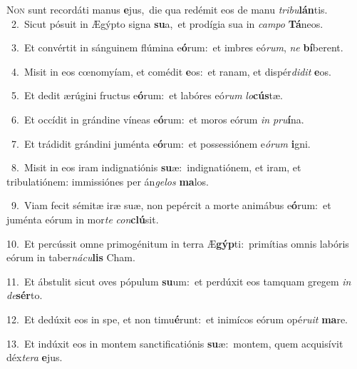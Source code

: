 \lettrine{\initial\textcolor{\initialcolor}{N}}{on} sunt recordáti manus \textbf{e}\-jus,~\star die qua redémit eos de manu \textit{tri}\-\textit{bu}\textbf{lán}tis.\\
{\numbfont\textcolor{\numbcolor}{~2.}}~Sicut pósuit in Ægýpto signa \textbf{su}\-a,~\star et prodígia sua in \textit{cam}\-\textit{po} \textbf{Tá}\-neos.\par
{\numbfont\textcolor{\numbcolor}{~3.}}~Et convértit in sánguinem flúmina e\-\textbf{ó}\-rum:~\star et imbres eó\-\textit{rum}\-, \textit{ne} \textbf{bí}\-berent.\par
{\numbfont\textcolor{\numbcolor}{~4.}}~Misit in eos cœnomyíam, et comédit \textbf{e}\-os:~\star et ranam, et dispér\-\textit{di}\-\textit{dit} \textbf{e}\-os.\par
{\numbfont\textcolor{\numbcolor}{~5.}}~Et dedit ærúgini fructus e\-\textbf{ó}\-rum:~\star et labóres eó\textit{rum} \textit{lo}\-\textbf{cús}tæ.\par
{\numbfont\textcolor{\numbcolor}{~6.}}~Et occídit in grándine víneas e\-\textbf{ó}\-rum:~\star et moros eórum \textit{in} \textit{pru}\-\textbf{í}na.\par
{\numbfont\textcolor{\numbcolor}{~7.}}~Et trádidit grándini juménta e\-\textbf{ó}\-rum:~\star et possessiónem e\-\textit{ó}\-\textit{rum} \textbf{i}\-gni.\par
{\numbfont\textcolor{\numbcolor}{~8.}}~Misit in eos iram indignatiónis \textbf{su}\-æ:~\star indignatiónem, et iram, et tribulatiónem: immissiónes per án\-\textit{ge}\-\textit{los} \textbf{ma}\-los.\par
{\numbfont\textcolor{\numbcolor}{~9.}}~Viam fecit sémitæ iræ suæ, non pepércit a morte animábus e\-\textbf{ó}\-rum:~\star et juménta eórum in mor\textit{te} \textit{con}\-\textbf{clú}sit.\par
{\numbfont\textcolor{\numbcolor}{10.}}~Et percússit omne primogénitum in terra Æ\-\textbf{gýp}\-ti:~\star primítias omnis labóris eórum in taber\-\textit{ná}\-\textit{cu}\textbf{lis} Cham.\par
{\numbfont\textcolor{\numbcolor}{11.}}~Et ábstulit sicut oves pópulum \textbf{su}\-um:~\star et perdúxit eos tamquam gregem \textit{in} \textit{de}\-\textbf{sér}to.\par
{\numbfont\textcolor{\numbcolor}{12.}}~Et dedúxit eos in spe, et non timu\-\textbf{é}\-runt:~\star et inimícos eórum opé\-\textit{ru}\-\textit{it} \textbf{ma}\-re.\par
{\numbfont\textcolor{\numbcolor}{13.}}~Et indúxit eos in montem sanctificatiónis \textbf{su}\-æ:~\star montem, quem acquisívit déx\-\textit{te}\-\textit{ra} \textbf{e}\-jus.\par
